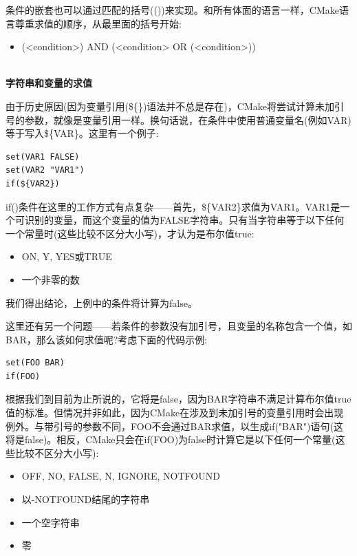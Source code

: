 条件的嵌套也可以通过匹配的括号(())来实现。和所有体面的语言一样，CMake语言尊重求值的顺序，从最里面的括号开始:

\begin{itemize}
\item 
(<condition>) AND (<condition> OR (<condition>))
\end{itemize}

\hspace*{\fill} \\ %
\noindent
\textbf{字符串和变量的求值}

由于历史原因(因为变量引用(\$\{\})语法并不总是存在)，CMake将尝试计算未加引号的参数，就像是变量引用一样。换句话说，在条件中使用普通变量名(例如VAR)等于写入\$\{VAR\}。这里有一个例子:

\begin{lstlisting}[style=styleCMake]
set(VAR1 FALSE)
set(VAR2 "VAR1")
if(${VAR2})
\end{lstlisting}

if()条件在这里的工作方式有点复杂——首先，\$\{VAR2\}求值为VAR1。VAR1是一个可识别的变量，而这个变量的值为FALSE字符串。只有当字符串等于以下任何一个常量时(这些比较不区分大小写)，才认为是布尔值true:

\begin{itemize}
\item 
ON, Y, YES或TRUE

\item 
一个非零的数
\end{itemize}

我们得出结论，上例中的条件将计算为false。

这里还有另一个问题——若条件的参数没有加引号，且变量的名称包含一个值，如BAR，那么该如何求值呢?考虑下面的代码示例:

\begin{lstlisting}[style=styleCMake]
set(FOO BAR)
if(FOO)
\end{lstlisting}

根据我们到目前为止所说的，它将是false，因为BAR字符串不满足计算布尔值true值的标准。但情况并非如此，因为CMake在涉及到未加引号的变量引用时会出现例外。与带引号的参数不同，FOO不会通过BAR求值，以生成if("BAR")语句(这将是false)。相反，CMake只会在if(FOO)为false时计算它是以下任何一个常量(这些比较不区分大小写):

\begin{itemize}
\item 
OFF, NO, FALSE, N, IGNORE, NOTFOUND

\item 
以-NOTFOUND结尾的字符串

\item 
一个空字符串

\item 
零
\end{itemize}


